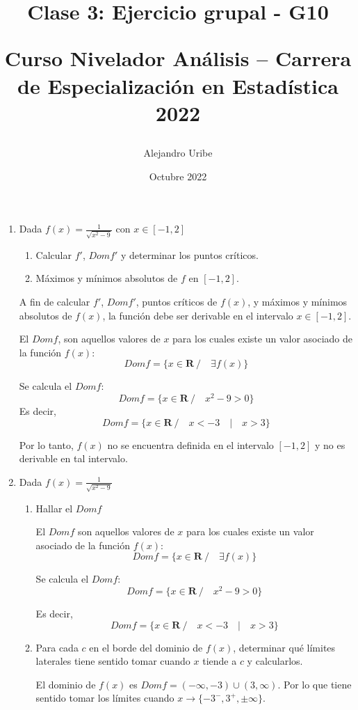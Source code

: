 \documentclass{article}
\title{
Clase 3: Ejercicio grupal - G10

Curso Nivelador Análisis – Carrera de Especialización en Estadística 2022
}
\author{Alejandro Uribe}
\date{Octubre 2022}
\begin{document}
\maketitle

\begin{enumerate}
    \item Dada $f(x) = \frac{1}{\sqrt{x^2-9}}$ con $x \in [-1, 2]$
          \begin{enumerate}
              \item Calcular $f'$, $Domf'$ y determinar los puntos críticos.
              \item Máximos y mínimos absolutos de $f$ en $[-1, 2]$.
          \end{enumerate}
          A fin de calcular $f'$, $Domf'$, puntos críticos de $f(x)$, y máximos y mínimos absolutos de $f(x)$, la función debe ser derivable en el intervalo $x\in[-1,2]$.

          El $Domf$, son aquellos valores de $x$ para los cuales existe un valor asociado de la función $f(x)$:
          $$Domf = \{ x \in \mathbf{R}\ / \quad \exists f(x)\}$$

          Se calcula el $Domf$:
          $$Domf = \{ x \in \mathbf{R}\ / \quad x^2-9 > 0\}$$
          Es decir,
          $$Domf = \{ x \in \mathbf{R}\ / \quad x<-3 \quad | \quad x>3 \}$$

          Por lo tanto, $f(x)$ no se encuentra definida en el intervalo $[-1,2]$ y no es derivable en tal intervalo.
    \item Dada $f(x) = \frac{1}{\sqrt{x^2-9}}$
          \begin{enumerate}
              \item Hallar el $Domf$

                    El $Domf$ son aquellos valores de $x$ para los cuales existe un valor asociado de la función $f(x)$:
                    $$Domf = \{ x \in \mathbf{R}\ / \quad \exists f(x)\}$$

                    Se calcula el $Domf$:
                    $$Domf = \{ x \in \mathbf{R}\ / \quad x^2-9 > 0\}$$

                    Es decir,
                    $$Domf = \{ x \in \mathbf{R}\ / \quad x<-3 \quad | \quad x>3 \}$$

              \item Para cada $c$ en el borde del dominio de $f(x)$, determinar qué límites laterales tiene sentido tomar cuando $x$ tiende a $c$ y calcularlos.

                    El dominio de $f(x)$ es $Domf = (-\infty, -3) \cup (3, \infty)$. Por lo que tiene sentido tomar los límites cuando $x \to \{-3^-, 3^+, \pm \infty\}$.


\end{enumerate}
\end{enumerate}
\end{document}
